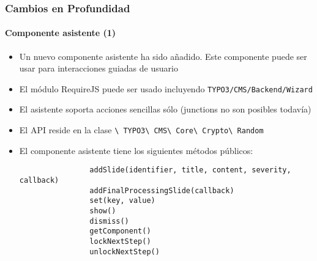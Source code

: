 \begin{frame}[fragile]
	\frametitle{Cambios en Profundidad}
	\framesubtitle{Componente asistente (1)}

	\lstset{basicstyle=\tiny\ttfamily}

	\begin{itemize}

		\item Un nuevo componente asistente ha sido añadido. Este componente puede ser usar para interacciones guiadas de usuario

		\item El módulo RequireJS puede ser usado incluyendo \texttt{TYPO3/CMS/Backend/Wizard}

		\item El asistente soporta acciones sencillas sólo\newline
			(junctions no son posibles todavía)

		\item El API reside en la clase
			\texttt{\textbackslash
				TYPO3\textbackslash
				CMS\textbackslash
				Core\textbackslash
				Crypto\textbackslash
				Random}

		\item El componente asistente tiene los siguientes métodos públicos:

			\begin{lstlisting}
				addSlide(identifier, title, content, severity, callback)
				addFinalProcessingSlide(callback)
				set(key, value)
				show()
				dismiss()
				getComponent()
				lockNextStep()
				unlockNextStep()
			\end{lstlisting}

	\end{itemize}

\end{frame}

